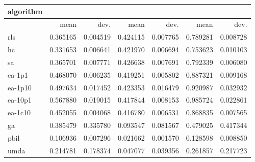 \begin{tabular}{@{}l*{6}{>{{}}N{1}{2}}@{}}
\toprule
{algorithm} &  &  &  \\
\midrule
& {mean} & {dev.} & {mean} & {dev.} & {mean} & {dev.} \\
\midrule
rls & 0.365165 & 0.004519 & 0.424115 & 0.007765 & 0.789281 & 0.008728 \\
 hc & 0.331653 & 0.006641 & 0.421970 & 0.006694 & 0.753623 & 0.010103 \\
 sa & 0.365701 & 0.007771 & 0.426638 & 0.007691 & 0.792339 & 0.006080 \\
 ea-1p1 & 0.468070 & 0.006235 & 0.419251 & 0.005802 & 0.887321 & 0.009168 \\
 ea-1p10 & 0.497634 & 0.017452 & 0.423353 & 0.016479 & 0.920987 & 0.032932 \\
 ea-10p1 & 0.567880 & 0.019015 & 0.417844 & 0.008153 & 0.985724 & 0.022861 \\
 ea-1c10 & 0.452055 & 0.004068 & 0.416780 & 0.006531 & 0.868835 & 0.007565 \\
 ga & 0.385479 & 0.335780 & 0.093547 & 0.081567 & 0.479025 & 0.417344 \\
 pbil & 0.106936 & 0.007296 & 0.021662 & 0.001570 & 0.128598 & 0.008850 \\
 umda & 0.214781 & 0.178374 & 0.047077 & 0.039356 & 0.261857 & 0.217723 \\
 \bottomrule
\end{tabular}
